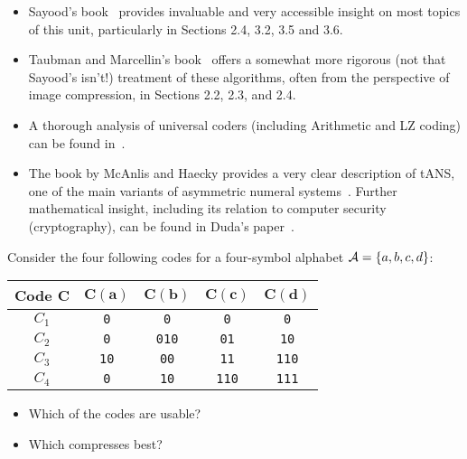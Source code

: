 \begin{itemize}
\item Sayood's book~\cite{sayood_introduction} provides invaluable and very accessible insight on most topics of this unit,
particularly in Sections 2.4, 3.2, 3.5 and 3.6.

\item Taubman and Marcellin's book~\cite{taubman2002jpeg2000} offers a somewhat more rigorous (not that Sayood's isn't!) treatment of these algorithms, often from the perspective of image compression, in Sections 2.2, 2.3, and 2.4.

\item A thorough analysis of universal coders (including Arithmetic and LZ coding) can be found in~\cite[\S 13]{cover_elements}.

\item The book by McAnlis and Haecky provides a very clear description of tANS, one of the main
variants of asymmetric numeral systems~\cite[\S 5.5]{mcanlis_understanding}. Further mathematical
insight, including its relation to computer security (cryptography), can be found in Duda's paper~\cite{duda_asn}.

\end{itemize}


\begin{exercise}
Consider the four following codes for a four-symbol alphabet $\mathcal{A} = \{a,b,c,d\}$:

\begin{center}
\begin{tabular}{ccccc}
\toprule
\textbf{Code $\mathbf{C}$} & $\mathbf{C(a)}$ & $\mathbf{C(b)}$ & $\mathbf{C(c)}$ & $\mathbf{C(d)}$ \\
\toprule
$C_1$ & \texttt{0} & \texttt{0} & \texttt{0} & \texttt{0} \\
$C_2$ & \texttt{0} & \texttt{010} & \texttt{01} & \texttt{10} \\
$C_3$ & \texttt{10} & \texttt{00} & \texttt{11} & \texttt{110} \\
$C_4$ & \texttt{0} & \texttt{10} & \texttt{110} & \texttt{111} \\
\bottomrule
\end{tabular}
\end{center}

\begin{itemize}
\item Which of the codes are usable?
\item Which compresses best?
\end{itemize}

\end{exercise}


